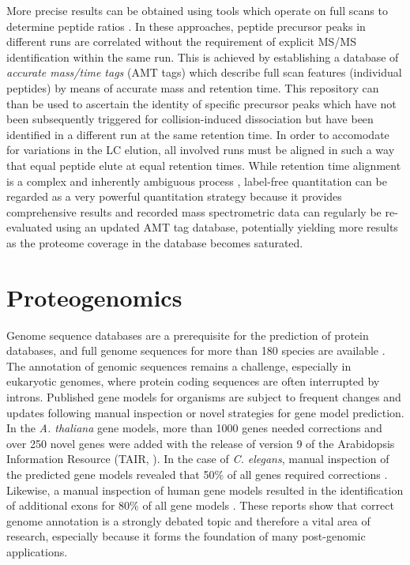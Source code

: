 More precise results can be obtained using tools which operate on full scans
to determine peptide ratios \citep{Mueller2007, Park2008}.
In these approaches, peptide precursor peaks in different runs are correlated 
without the requirement of explicit MS/MS identification within the same run.
This is achieved by establishing a database of {\em accurate mass/time tags} 
(AMT tags) which describe full scan features (individual peptides) by means
of accurate mass and retention time.
This repository can than be used to ascertain the identity of specific precursor
peaks which have not been subsequently triggered for collision-induced 
dissociation but have been identified in a different run at the same retention 
time.
In order to accomodate for variations in the LC elution, all involved runs
must be aligned in such a way that equal peptide elute at equal retention times.
While retention time alignment is a complex and inherently ambiguous process
\citep{Fischer2006}, label-free quantitation can be regarded as a very powerful
quantitation strategy because it provides comprehensive results and recorded 
mass spectrometric data can regularly be re-evaluated using an updated AMT tag 
database, potentially yielding more results as the proteome coverage in
the database becomes saturated.


\section{Proteogenomics}
\label{proteogenomics}

Genome sequence databases are a prerequisite for the prediction of protein 
databases, and full genome sequences for more than 180 species are available
\citep{Yates2009}.
The annotation of genomic sequences remains a challenge, especially in
eukaryotic genomes, where protein coding sequences are often interrupted by
introns.
Published gene models for organisms are subject to frequent changes and updates
following manual inspection or novel strategies for gene model prediction.
In the {\em A. thaliana} gene models, more than 1000 genes needed corrections
and over 250 novel genes were added with the release of version 9 of the
Arabidopsis Information Resource (TAIR, \cite{Huala2001}).
In the case of {\em C. elegans}, manual inspection of the predicted gene models
revealed that 50\% of all genes required corrections \citep{Reboul2003}.
Likewise, a manual inspection of human gene models resulted in the 
identification of additional exons for 80\% of all gene models 
\citep{Pennisi2007}.
These reports show that correct genome annotation is a strongly debated
topic and therefore a vital area of research, especially because it forms
the foundation of many post-genomic applications.

